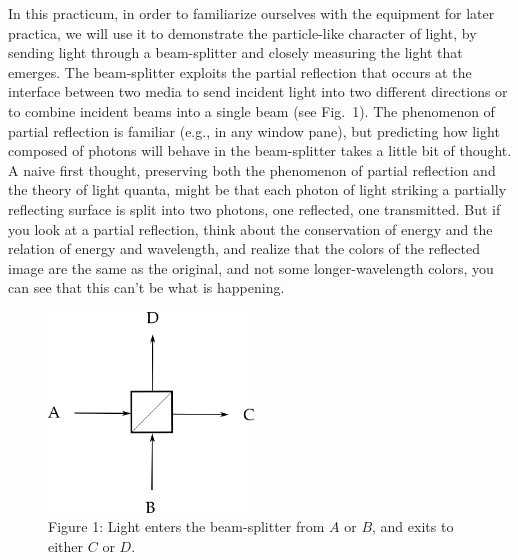In this practicum, in order to familiarize ourselves with the equipment for later practica, we will use it to demonstrate the particle-like character of light, by sending light through a beam-splitter and closely measuring the light that emerges. The beam-splitter exploits the partial reflection that occurs at the interface between two media to send incident light into two different directions or to combine incident beams into a single beam (see Fig.\ 1). The phenomenon of partial reflection is familiar (e.g., in any window pane), but predicting how light composed of photons will behave in the beam-splitter takes a little bit of thought. A naive first thought, preserving both the phenomenon of partial reflection and the theory of light quanta, might be that each photon of light striking a partially reflecting surface is split into two photons, one reflected, one transmitted. But if you look at a partial reflection, think about the conservation of energy and the relation of energy and wavelength, and realize that the colors of the reflected image are the same as the original, and not some longer-wavelength colors, you can see that this can't be what is happening.


\begin{figure}[h] 
  \begin{center}
    \captionsetup{width=.75\textwidth}
    \includegraphics[width=2.15in,height=2.09333in]{images/13_optics-lab/beam-splitter.png}
    \caption*{Figure 1: Light enters the beam-splitter from $A$ or $B$, and exits to either $C$ or $D$.}
  \end{center}
\end{figure}


